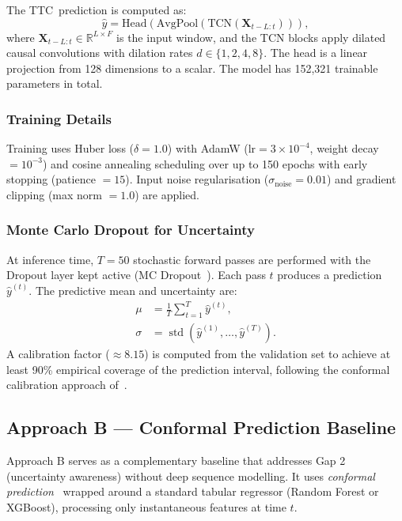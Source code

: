 \documentclass[12pt,a4paper]{article}
\newcommand{\ttc}{\textsc{TTC}}
\begin{document}
The \ttc\ prediction is computed as:
\begin{equation}
    \hat{y} = \text{Head}\!\left(\text{AvgPool}\left(\text{TCN}(\mathbf{X}_{t-L:t})\right)\right),
    \label{eq:tcn}
\end{equation}
where $\mathbf{X}_{t-L:t} \in \mathbb{R}^{L \times F}$ is the input window, and the TCN blocks apply dilated causal convolutions with dilation rates $d \in \{1, 2, 4, 8\}$. The head is a linear projection from 128 dimensions to a scalar. The model has 152,321 trainable parameters in total.

\subsubsection{Training Details}
Training uses Huber loss ($\delta = 1.0$) with AdamW ($\text{lr} = 3 \times 10^{-4}$, weight decay $= 10^{-3}$) and cosine annealing scheduling over up to 150 epochs with early stopping (patience $= 15$). Input noise regularisation ($\sigma_{\text{noise}} = 0.01$) and gradient clipping (max norm $= 1.0$) are applied.

\subsubsection{Monte Carlo Dropout for Uncertainty}
At inference time, $T = 50$ stochastic forward passes are performed with the Dropout layer kept active (MC Dropout~\cite{gal2016dropout}). Each pass $t$ produces a prediction $\hat{y}^{(t)}$. The predictive mean and uncertainty are:
\begin{align}
    \mu &= \frac{1}{T}\sum_{t=1}^{T} \hat{y}^{(t)}, \label{eq:mcmean} \\
    \sigma &= \operatorname{std}\!\left(\hat{y}^{(1)}, \ldots, \hat{y}^{(T)}\right). \label{eq:mcstd}
\end{align}
A calibration factor ($\approx 8.15$) is computed from the validation set to achieve at least 90\% empirical coverage of the prediction interval, following the conformal calibration approach of~\cite{angelopoulos2021conformal}.

\subsection{Approach B — Conformal Prediction Baseline}
\label{subsec:approach_b}

Approach B serves as a complementary baseline that addresses Gap 2 (uncertainty awareness) without deep sequence modelling. It uses \emph{conformal prediction}~\cite{vovk2005algorithmic} wrapped around a standard tabular regressor (Random Forest or XGBoost), processing only instantaneous features at time $t$.
\end{document}
